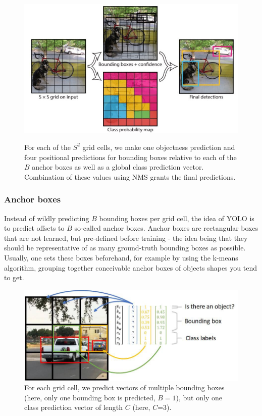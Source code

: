 \documentclass[a4paper]{article}
\begin{document}
\begin{figure}
\includegraphics[scale=0.35]{images/yolo_model}\label{fig:yolomodel}
\caption{For each of the $S^2$ grid cells, we make one objectness prediction and four positional predictions for bounding boxes relative to each of the $B$ anchor boxes as well as a global class prediction vector. Combination of these values using NMS grants the final predictions.}
\end{figure}


\subsubsection*{Anchor boxes}
Instead of wildly predicting $B$ bounding boxes per grid cell, the idea of YOLO is to predict offsets to $B$ so-called anchor boxes. Anchor boxes are rectangular boxes that are not learned, but pre-defined before training - the idea being that they should be representative of as many ground-truth bounding boxes as possible. \\
Usually, one sets these boxes beforehand, for example by using the k-means algorithm, grouping together conceivable anchor boxes of objects shapes you tend to get. 
\begin{figure}
\includegraphics[scale=0.35]{images/yolo_mechanics}
\caption{For each grid cell, we predict vectors of multiple bounding boxes (here, only one bounding box is predicted, $B=1$), but only one class prediction vector of length $C$ (here, $C$=3).}
\label{fig:cell}
\end{figure}
\end{document}
